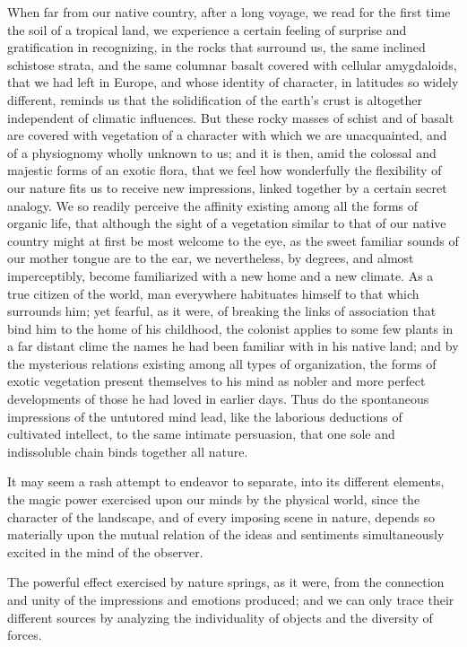 When far from our native country, after a long voyage, we read for the first time the soil of a tropical land, we experience a certain feeling of surprise and gratification in recognizing, in the rocks that surround us, the same inclined schistose strata, and the same columnar basalt covered with cellular amygdaloids, that we had left in Europe, and whose identity of character, in latitudes so widely different, reminds us that the solidification of the earth's crust is altogether independent of climatic influences. But these rocky masses of schist and of basalt are covered with vegetation of a character with which we are unacquainted, and of a physiognomy wholly unknown to us; and it is then, amid the colossal and majestic forms of an exotic flora, that we feel how wonderfully the flexibility of our nature fits us to receive new impressions, linked together by a certain secret analogy. We so readily perceive the affinity existing among all the forms of organic life, that although the sight of a vegetation similar to that of our native country might at first be most welcome to the eye, as the sweet familiar sounds of our mother tongue are to the ear, we nevertheless, by degrees, and almost imperceptibly, become familiarized with a new home and a new climate. As a true citizen of the world, man everywhere habituates himself to that which surrounds him; yet fearful, as it were, of breaking the links of association that bind him to the home of his childhood, the colonist applies to some few plants in a far distant clime the names he had been familiar with in his native land; and by the mysterious relations existing among all types of organization, the forms of exotic vegetation present themselves to his mind as nobler and more perfect developments of those he had loved in earlier days. Thus do the spontaneous impressions of the untutored mind lead, like the laborious deductions of cultivated intellect, to the same intimate persuasion, that one sole and indissoluble chain binds together all nature.

It may seem a rash attempt to endeavor to separate, into its different elements, the magic power exercised upon our minds by the physical world, since the character of the landscape, and of every imposing scene in nature, depends so materially upon the mutual relation of the ideas and sentiments simultaneously excited in the mind of the observer.

The powerful effect exercised by nature springs, as it were, from the connection and unity of the impressions and emotions produced; and we can only trace their different sources by analyzing the individuality of objects and the diversity of forces.

